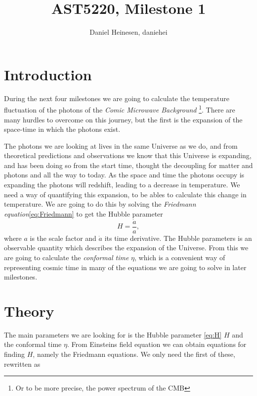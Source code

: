 \documentclass[a4paper,norsk, 10pt]{article}
\title{AST5220, Milestone 1}
\author{Daniel Heinesen, daniehei}
\begin{document}
\maketitle

\section{Introduction}
During the next four milestones we are going to calculate the temperature fluctuation of the photons of the \textit{Comic Microwave Background} \footnote{Or to be more precise, the power spectrum of the CMB}. There are many hurdles to overcome on this journey, but the first is the expansion of the space-time in which the photons exist.

The photons we are looking at lives in the same Universe as we do, and from theoretical predictions and observations we know that this Universe is expanding, and has been doing so from the start time, thought the decoupling for matter and photons and all the way to today. As the space and time the photons occupy is expanding the photons will redshift, leading to a decrease in temperature. 
We need a way of quantifying this expansion, to be ables to calculate this change in temperature. We are going to do this by solving the \textit{Friedmann equation}\eqref{eq:Friedmann} to get the Hubble parameter
\begin{equation}\label{eq:H}
H = \frac{\dot{a}}{a},
\end{equation}
where $a$ is the scale factor and $\dot{a}$ its time derivative. The Hubble parameters is an observable quantity which describes the expansion of the Universe. From this we are going to calculate the \textit{conformal time} $\eta$, which is a convenient way of representing cosmic time in many of the equations we are going to solve in later milestones.



\section{Theory}


The main parameters we are looking for is the Hubble parameter \eqref{eq:H} $H$ and the conformal time $\eta$. From Einsteins field equation we can obtain equations for finding $H$, namely the Friedmann equations. We only need the first of these, rewritten as
\end{document}
